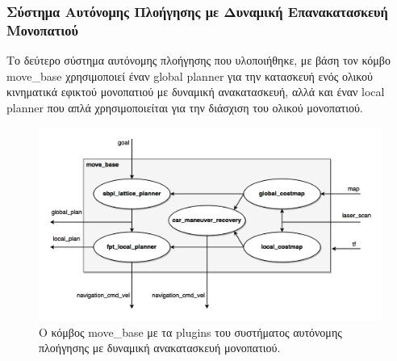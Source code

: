 \subsubsection{Σύστημα Αυτόνομης Πλοήγησης με Δυναμική Επανακατασκευή Μονοπατιού}
Το δεύτερο σύστημα αυτόνομης πλοήγησης που υλοποιήθηκε, με βάση τον κόμβο move{\_}base χρησιμοποιεί έναν global planner για την κατασκευή ενός ολικού κινηματικά εφικτού μονοπατιού με δυναμική ανακατασκευή, αλλά και έναν local planner που απλά χρησιμοποιείται για την διάσχιση του ολικού μονοπατιού.

\begin{figure}[!ht]
	\centering
	\includegraphics[width=\linewidth]{Chapters/Chapter4/Figures/navigation_2_plugins.png}
	\caption{Ο κόμβος move{\_}base με τα plugins του συστήματος αυτόνομης πλοήγησης με δυναμική ανακατασκευή μονοπατιού.}
	\label{fig:navigation_2_plugins}
\end{figure}

